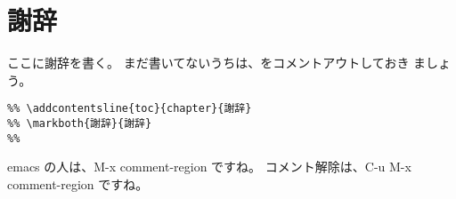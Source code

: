\chapter*{謝辞}
ここに謝辞を書く。
まだ書いてないうちは、\verb++をコメントアウトしておき
ましょう。
\begin{verbatim}
%% \addcontentsline{toc}{chapter}{謝辞}
%% \markboth{謝辞}{謝辞}
%% 
\end{verbatim}

emacs の人は、M-x comment-region ですね。
コメント解除は、C-u M-x comment-region ですね。

